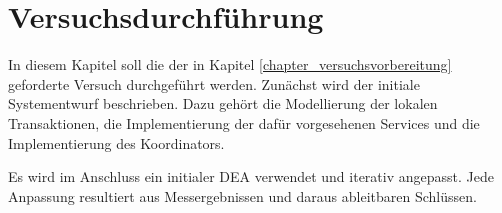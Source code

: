 \chapter{Versuchsdurchführung} \label{chapter_basic_saga}

In diesem Kapitel soll die der in Kapitel \ref{chapter_versuchsvorbereitung} geforderte Versuch durchgeführt werden. Zunächst wird der initiale Systementwurf beschrieben. Dazu gehört die Modellierung der lokalen Transaktionen, die Implementierung der dafür vorgesehenen Services und die Implementierung des Koordinators.

Es wird im Anschluss ein initialer DEA verwendet und iterativ angepasst. Jede Anpassung resultiert aus Messergebnissen und daraus ableitbaren Schlüssen.



















